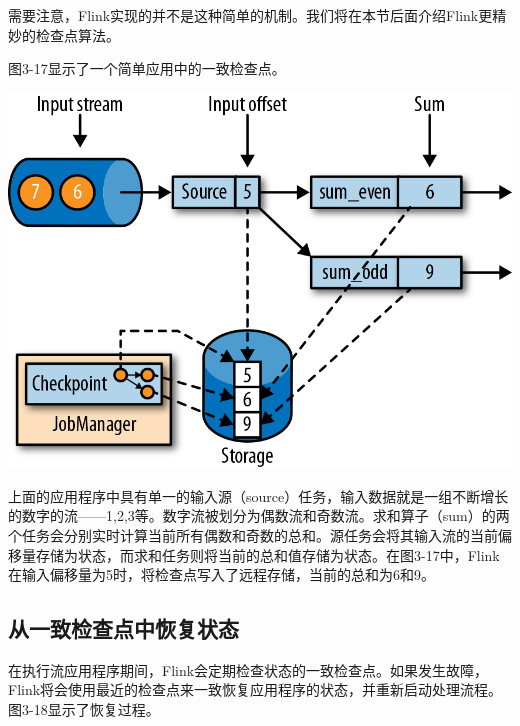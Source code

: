 \documentclass[oneside]{ctexbook}
\begin{document}
需要注意，Flink实现的并不是这种简单的机制。我们将在本节后面介绍Flink更精妙的检查点算法。

图3-17显示了一个简单应用中的一致检查点。

\noindent \includegraphics[width=\textwidth]{spaf_0317.png}

上面的应用程序中具有单一的输入源（source）任务，输入数据就是一组不断增长的数字的流——1,2,3等。数字流被划分为偶数流和奇数流。求和算子（sum）的两个任务会分别实时计算当前所有偶数和奇数的总和。源任务会将其输入流的当前偏移量存储为状态，而求和任务则将当前的总和值存储为状态。在图3-17中，Flink在输入偏移量为5时，将检查点写入了远程存储，当前的总和为6和9。

\subsection{从一致检查点中恢复状态}

在执行流应用程序期间，Flink会定期检查状态的一致检查点。如果发生故障，Flink将会使用最近的检查点来一致恢复应用程序的状态，并重新启动处理流程。图3-18显示了恢复过程。
\end{document}
